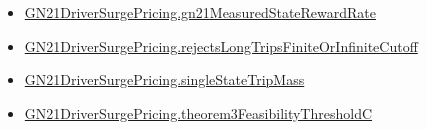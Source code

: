 \documentclass[10pt]{article}
\begin{document}
\begin{itemize}
\item \hyperlink{governing-declaration-bafe7c69655a9faa}{GN21\allowbreak{}Driver\allowbreak{}Surge\allowbreak{}Pricing.\allowbreak{}gn21\allowbreak{}Measured\allowbreak{}State\allowbreak{}Reward\allowbreak{}Rate}
\item \hyperlink{governing-declaration-632d5ef275430b3e}{GN21\allowbreak{}Driver\allowbreak{}Surge\allowbreak{}Pricing.\allowbreak{}rejects\allowbreak{}Long\allowbreak{}Trips\allowbreak{}Finite\allowbreak{}Or\allowbreak{}Infinite\allowbreak{}Cutoff}
\item \hyperlink{governing-declaration-1c88cf5996e161d3}{GN21\allowbreak{}Driver\allowbreak{}Surge\allowbreak{}Pricing.\allowbreak{}single\allowbreak{}State\allowbreak{}Trip\allowbreak{}Mass}
\item \hyperlink{governing-declaration-7b73f055f20c006f}{GN21\allowbreak{}Driver\allowbreak{}Surge\allowbreak{}Pricing.\allowbreak{}theorem3\allowbreak{}Feasibility\allowbreak{}Threshold\allowbreak{}C}
\end{itemize}
\end{document}
